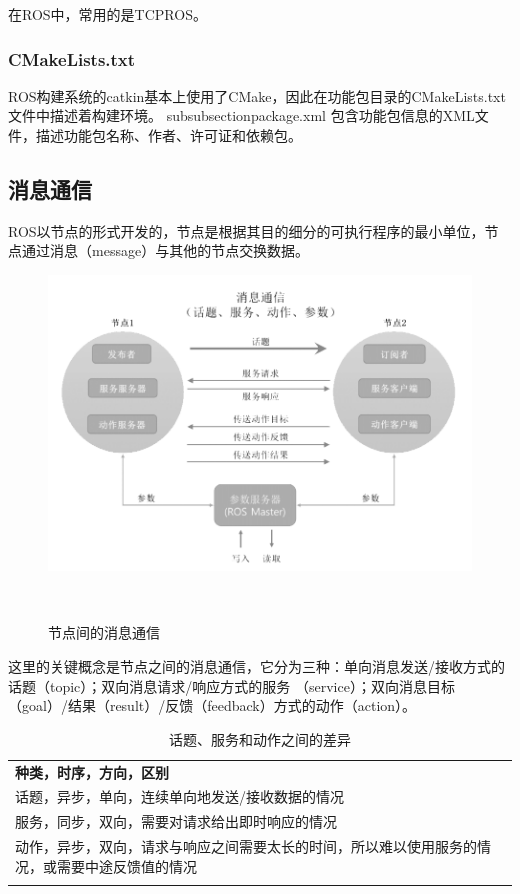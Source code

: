 \documentclass[geye,green,kindle,cn]{elegantnote}
\begin{document}
在ROS中，常用的是TCPROS。
\subsubsection{CMakeLists.txt}
ROS构建系统的catkin基本上使用了CMake，因此在功能包目录的CMakeLists.txt文件中描述着构建环境。
subsubsection{package.xml}
包含功能包信息的XML文件，描述功能包名称、作者、许可证和依赖包。
\subsection{消息通信}
ROS以节点的形式开发的，节点是根据其目的细分的可执行程序的最小单位，节点通过消息（message）与其他的节点交换数据。
\begin{figure}[htbp]
    \centering
    \includegraphics[width=1\linewidth]{src/A.png}
    \centering
    \caption{节点间的消息通信} \label{picture:A}
\end{figure}

这里的关键概念是节点之间的消息通信，它分为三种：单向消息发送/接收方式的话题（topic）；双向消息请求/响应方式的服务 （service）；双向消息目标（goal）/结果（result）/反馈（feedback）方式的动作（action）。
\begin{table}[htbp]
    \centering
    \begin{tabular}{p{200pt}}
    \Xhline{1.0pt}
    \textbf{种类，时序，方向，区别} \\
    \Xhline{1.0pt}
    话题，异步，单向，连续单向地发送/接收数据的情况 \\
    \hline
    服务，同步，双向，需要对请求给出即时响应的情况 \\
    \hline
    动作，异步，双向，请求与响应之间需要太长的时间，所以难以使用服务的情况，或需要中途反馈值的情况 \\
    \Xhline{1.0pt}
    \end{tabular}
    \centering
    \caption{话题、服务和动作之间的差异} \label{table:A}
\end{table}
\end{document}
